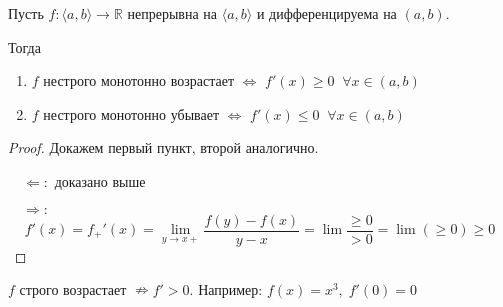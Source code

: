 \begin{theorem-non}
    Пусть $f: \langle a, b \rangle \to \mathbb{R}$ непрерывна на $\langle a, b \rangle$ и дифференцируема на $(a, b)$.

    Тогда
    \begin{enumerate}
        \item $f$ нестрого монотонно возрастает $\Leftrightarrow$ $f'(x) \geqslant 0 \;\; \forall x \in (a, b)$
        \item $f$ нестрого монотонно убывает $\Leftrightarrow$ $f'(x) \leqslant 0 \;\; \forall x \in (a, b)$
    \end{enumerate}
\end{theorem-non}
\begin{proof}
    Докажем первый пункт, второй аналогично.

    $\quad \Leftarrow:$ доказано выше

    $\quad \Rightarrow:$ 
    \[ f'(x) = f_+'(x) = \lim_{y \to x+} \frac{f(y) - f(x)}{y - x} = \lim \frac{\geqslant 0}{> 0} = \lim (\geqslant 0) \geqslant 0 \]
\end{proof}
\begin{notice}
    $f$ строго возрастает $\nRightarrow f' > 0$. Например: $f(x) = x^3, \; f'(0) = 0$
\end{notice}
